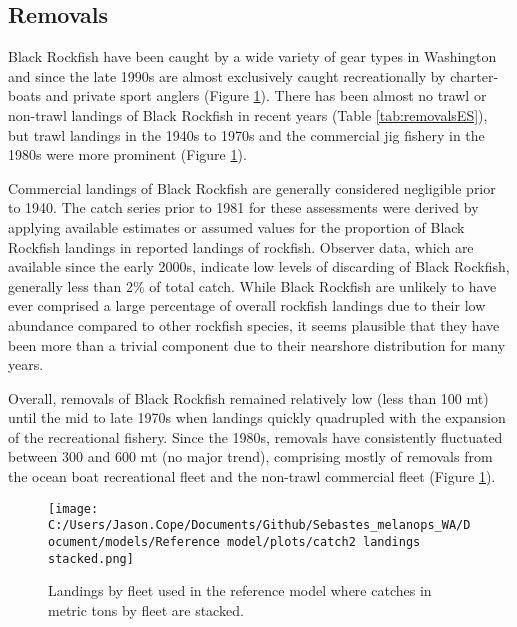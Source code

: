 \documentclass[11pt,
  english,
  letterpaper,
]{article}
\begin{document}
\hypertarget{removals}{%
\subsection*{Removals}\label{removals}}

Black Rockfish have been caught by a wide variety of gear types in Washington and since the late 1990s are almost exclusively caught recreationally by charter-boats and private sport anglers (Figure \ref{fig:es-catch}). There has been almost no trawl or non-trawl landings of Black Rockfish in recent years (Table \ref{tab:removalsES}), but trawl landings in the 1940s to 1970s and the commercial jig fishery in the 1980s were more prominent (Figure \ref{fig:es-catch}).

Commercial landings of Black Rockfish are generally considered negligible prior to 1940. The catch series prior to 1981 for these assessments were derived by applying available estimates or assumed values for the proportion of Black Rockfish landings in reported landings of rockfish. Observer data, which are available since the early 2000s, indicate low levels of discarding of Black Rockfish, generally less than 2\% of total catch. While Black Rockfish are unlikely to have ever comprised a large percentage of overall rockfish landings due to their low abundance compared to other rockfish species, it seems plausible that they have been more than a trivial component due to their nearshore distribution for many years.

Overall, removals of Black Rockfish remained relatively low (less than 100 mt) until the mid to late 1970s when landings quickly quadrupled with the expansion of the recreational fishery. Since the 1980s, removals have consistently fluctuated between 300 and 600 mt (no major trend), comprising mostly of removals from the ocean boat recreational fleet and the non-trawl commercial fleet (Figure \ref{fig:es-catch}).



\begin{figure}
\centering
\texttt{[image: C:/Users/Jason.Cope/Documents/Github/Sebastes\_melanops\_WA/Document/models/Reference model/plots/catch2 landings stacked.png]}
\caption{Landings by fleet used in the reference model where catches in metric tons by fleet are stacked.\label{fig:es-catch}}
\end{figure}

\clearpage
\end{document}
